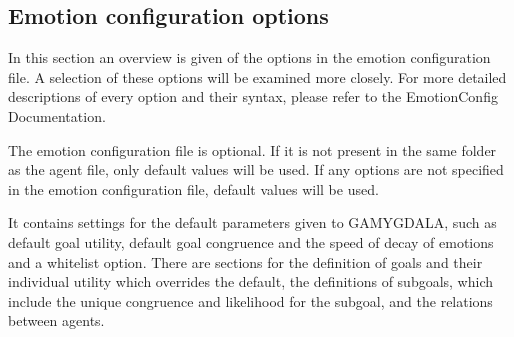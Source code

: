\documentclass[11pt]{article}
\begin{document}
\subsection{Emotion configuration options}
In this section an overview is given of the options in the emotion configuration file. A selection of these options will be examined more closely. For more detailed descriptions of every option and their syntax, please refer to the EmotionConfig Documentation\cite{emotionconfig}. 

The emotion configuration file is optional. If it is not present in the same folder as the agent file, only default values will be used. If any options are not specified in the emotion configuration file, default values will be used.

It contains settings for the default parameters given to GAMYGDALA, such as default goal utility, default goal congruence and the speed of decay of emotions and a whitelist option. There are sections for the definition of goals and their individual utility which overrides the default, the definitions of subgoals, which include the unique congruence and likelihood for the subgoal, and the relations between agents.
\end{document}
